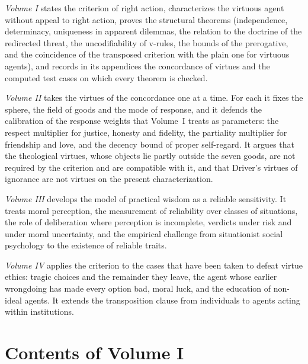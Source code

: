 \documentclass{situationist-preprint}
\begin{document}
\noindent\emph{Volume I} states the criterion of right action, characterizes the virtuous agent without appeal to right action, proves the structural theorems (independence, determinacy, uniqueness in apparent dilemmas, the relation to the doctrine of the redirected threat, the uncodifiability of v-rules, the bounds of the prerogative, and the coincidence of the transposed criterion with the plain one for virtuous agents), and records in its appendices the concordance of virtues and the computed test cases on which every theorem is checked.

\noindent\emph{Volume II} takes the virtues of the concordance one at a time. For each it fixes the sphere, the field of goods and the mode of response, and it defends the calibration of the response weights that Volume~I treats as parameters: the respect multiplier for justice, honesty and fidelity, the partiality multiplier for friendship and love, and the decency bound of proper self-regard. It argues that the theological virtues, whose objects lie partly outside the seven goods, are not required by the criterion and are compatible with it, and that Driver's virtues of ignorance are not virtues on the present characterization.

\noindent\emph{Volume III} develops the model of practical wisdom as a reliable sensitivity. It treats moral perception, the measurement of reliability over classes of situations, the role of deliberation where perception is incomplete, verdicts under risk and under moral uncertainty, and the empirical challenge from situationist social psychology to the existence of reliable traits.

\noindent\emph{Volume IV} applies the criterion to the cases that have been taken to defeat virtue ethics: tragic choices and the remainder they leave, the agent whose earlier wrongdoing has made every option bad, moral luck, and the education of non-ideal agents. It extends the transposition clause from individuals to agents acting within institutions.

\section*{Contents of Volume I}
\end{document}
